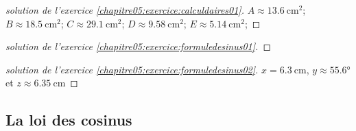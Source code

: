 \documentclass[main.tex]{subfiles}
\begin{document}
\begin{proof}[solution de l'exercice \ref{chapitre05:exercice:calculdaires01}] \hfill 	
	
$A\approx\SI{13.6}{\centi\meter^2}$; $B\approx\SI{18.5}{\centi\meter^2}$; $C\approx\SI{29.1}{\centi\meter^2}$; $D\approx\SI{9.58}{\centi\meter^2}$; $E\approx\SI{5.14}{\centi\meter^2}$; 
\end{proof}

\begin{proof}[solution de l'exercice \ref{chapitre05:exercice:formuledesinus01}] \hfill 	

\end{proof}
\begin{proof}[solution de l'exercice \ref{chapitre05:exercice:formuledesinus02}] \hfill 	
	
\noindent $x=\SI{6.3}{\centi\meter} $, $y\approx \ang{55.6}$ et $z\approx \SI{6.35}{\centi\meter}$
\end{proof}


 
%	
\newpage 
\subsection{La loi des cosinus}
\end{document}
